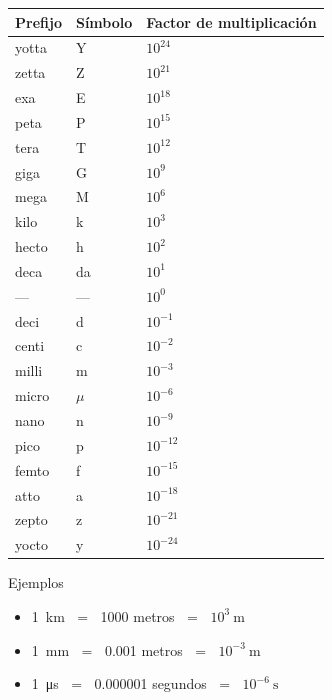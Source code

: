\begin{frame}

\footnotesize

    \begin{table}[h]
\centering
\begin{tabular}{|l|l|l|}
\hline
\textbf{Prefijo} & \textbf{Símbolo} & \textbf{Factor de multiplicación} \\ \hline
yotta  & Y  & $10^{24}$  \\ \hline
zetta  & Z  & $10^{21}$  \\ \hline
exa    & E  & $10^{18}$  \\ \hline
peta   & P  & $10^{15}$  \\ \hline
tera   & T  & $10^{12}$  \\ \hline
giga   & G  & $10^{9}$   \\ \hline
mega   & M  & $10^{6}$   \\ \hline
kilo   & k  & $10^{3}$   \\ \hline
hecto  & h  & $10^{2}$   \\ \hline
deca   & da & $10^{1}$   \\ \hline
—      & —  & $10^{0}$   \\ \hline
deci   & d  & $10^{-1}$  \\ \hline
centi  & c  & $10^{-2}$  \\ \hline
milli  & m  & $10^{-3}$  \\ \hline
micro  & $\mu$ & $10^{-6}$  \\ \hline
nano   & n  & $10^{-9}$  \\ \hline
pico   & p  & $10^{-12}$ \\ \hline
femto  & f  & $10^{-15}$ \\ \hline
atto   & a  & $10^{-18}$ \\ \hline
zepto  & z  & $10^{-21}$ \\ \hline
yocto  & y  & $10^{-24}$ \\ \hline
\end{tabular}
\end{table}
\end{frame}

\begin{frame}{Ejemplos}
    \begin{itemize}
    \item \SI{1}{\kilo\metre} $\;=\;$ 1000 metros $\;=\;$ $10^{3} \ \si{\metre}$
    \item \SI{1}{\milli\metre} $\;=\;$ 0.001 metros $\;=\;$ $10^{-3} \ \si{\metre}$
    \item \SI{1}{\micro\second} $\;=\;$ 0.000001 segundos $\;=\;$ $10^{-6} \ \si{\second}$
\end{itemize}
\end{frame}

